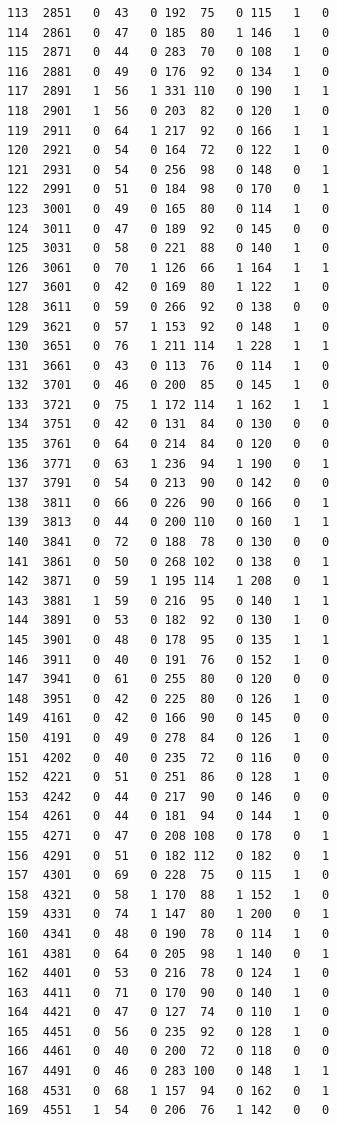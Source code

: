 \documentclass[
  letterpaper,
  DIV=11,
  numbers=noendperiod]{scrreprt}
\begin{document}
\begin{verbatim}
113  2851   0  43   0 192  75   0 115   1   0
114  2861   0  47   0 185  80   1 146   1   0
115  2871   0  44   0 283  70   0 108   1   0
116  2881   0  49   0 176  92   0 134   1   0
117  2891   1  56   1 331 110   0 190   1   1
118  2901   1  56   0 203  82   0 120   1   0
119  2911   0  64   1 217  92   0 166   1   1
120  2921   0  54   0 164  72   0 122   1   0
121  2931   0  54   0 256  98   0 148   0   1
122  2991   0  51   0 184  98   0 170   0   1
123  3001   0  49   0 165  80   0 114   1   0
124  3011   0  47   0 189  92   0 145   0   0
125  3031   0  58   0 221  88   0 140   1   0
126  3061   0  70   1 126  66   1 164   1   1
127  3601   0  42   0 169  80   1 122   1   0
128  3611   0  59   0 266  92   0 138   0   0
129  3621   0  57   1 153  92   0 148   1   0
130  3651   0  76   1 211 114   1 228   1   1
131  3661   0  43   0 113  76   0 114   1   0
132  3701   0  46   0 200  85   0 145   1   0
133  3721   0  75   1 172 114   1 162   1   1
134  3751   0  42   0 131  84   0 130   0   0
135  3761   0  64   0 214  84   0 120   0   0
136  3771   0  63   1 236  94   1 190   0   1
137  3791   0  54   0 213  90   0 142   0   0
138  3811   0  66   0 226  90   0 166   0   1
139  3813   0  44   0 200 110   0 160   1   1
140  3841   0  72   0 188  78   0 130   0   0
141  3861   0  50   0 268 102   0 138   0   1
142  3871   0  59   1 195 114   1 208   0   1
143  3881   1  59   0 216  95   0 140   1   1
144  3891   0  53   0 182  92   0 130   1   0
145  3901   0  48   0 178  95   0 135   1   1
146  3911   0  40   0 191  76   0 152   1   0
147  3941   0  61   0 255  80   0 120   0   0
148  3951   0  42   0 225  80   0 126   1   0
149  4161   0  42   0 166  90   0 145   0   0
150  4191   0  49   0 278  84   0 126   1   0
151  4202   0  40   0 235  72   0 116   0   0
152  4221   0  51   0 251  86   0 128   1   0
153  4242   0  44   0 217  90   0 146   0   0
154  4261   0  44   0 181  94   0 144   1   0
155  4271   0  47   0 208 108   0 178   0   1
156  4291   0  51   0 182 112   0 182   0   1
157  4301   0  69   0 228  75   0 115   1   0
158  4321   0  58   1 170  88   1 152   1   0
159  4331   0  74   1 147  80   1 200   0   1
160  4341   0  48   0 190  78   0 114   1   0
161  4381   0  64   0 205  98   1 140   0   1
162  4401   0  53   0 216  78   0 124   1   0
163  4411   0  71   0 170  90   0 140   1   0
164  4421   0  47   0 127  74   0 110   1   0
165  4451   0  56   0 235  92   0 128   1   0
166  4461   0  40   0 200  72   0 118   0   0
167  4491   0  46   0 283 100   0 148   1   1
168  4531   0  68   1 157  94   0 162   0   1
169  4551   1  54   0 206  76   1 142   0   0

\end{verbatim}
\end{document}
